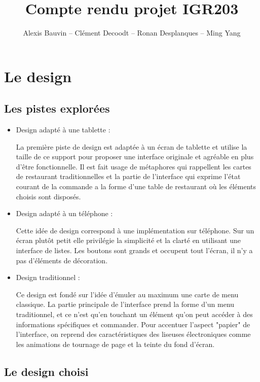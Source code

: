 \documentclass[a4paper,12pt]{article}
\title{Compte rendu projet IGR203}
\author{Alexis Bauvin -- Clément Decoodt -- Ronan Desplanques -- Ming Yang}
\begin{document}
\maketitle

\section{Le design}

\subsection{Les pistes explorées}

\begin{itemize}
\item Design adapté à une tablette :

La première piste de design est adaptée à un écran de tablette et utilise la taille de ce support pour proposer une interface originale et agréable en plus d'être fonctionnelle. Il est fait usage de métaphores qui rappellent les cartes de restaurant traditionnelles et la partie de l'interface qui exprime l'état courant de la commande a la forme d'une table de restaurant où les éléments choisis sont disposés.

\item Design adapté à un téléphone :

Cette idée de design correspond à une implémentation sur téléphone. Sur un écran plutôt petit elle privilégie la simplicité et la clarté en utilisant une interface de listes. Les boutons sont grands et occupent tout l'écran, il n'y a pas d'éléments de décoration.

\item Design traditionnel :

Ce design est fondé sur l'idée d'émuler au maximum une carte de menu classique. La partie principale de l'interface prend la forme d'un menu traditionnel, et ce n'est qu'en touchant un élément qu'on peut accéder à des informations spécifiques et commander. Pour accentuer l'aspect "papier" de l'interface, on reprend des caractéristiques des liseuses électroniques comme les animations de tournage de page et la teinte du fond d'écran.

\end{itemize}

\subsection{Le design choisi}
\end{document}
